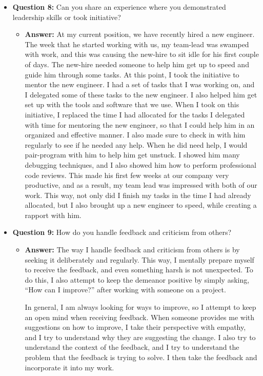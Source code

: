 \documentclass{article}
\begin{document}
\begin{itemize}
    \item \textbf{Question 8:} Can you share an experience where you demonstrated leadership skills or took initiative?
    \begin{itemize}
        \item \textbf{Answer:} At my current position, we have recently hired
        a new engineer. The week that he started working with us, my team-lead was swamped
        with work, and this was causing the new-hire to sit idle for his first
        couple of days. The new-hire needed someone to help him get up
        to speed and guide him through some tasks.
        At this point, I took the initiative to mentor the new engineer.
        I had a set of tasks that I was working on, and I delegated some
        of these tasks to the new engineer. I also helped him get set up
        with the tools and software that we use. When I took on this initiative,
        I replaced the time I had allocated for the tasks I delegated
        with time for mentoring the new engineer, so that I could
        help him in an organized and effective manner.
        I also made sure to check in with him
        regularly to see if he needed any help. When he did need help,
        I would pair-program with him to help him get unstuck. I showed him
        many debugging techniques, and I also showed him how to perform
        professional code reviews. This made his first few weeks at our
        company very productive, and as a result, my team lead was
        impressed with both of our work. This way, not only did I finish my tasks
        in the time I had already allocated, but I also brought up a new
        engineer to speed, while creating a rapport with him.
    \end{itemize}
    
    \item \textbf{Question 9:} How do you handle feedback and criticism from others?
    \begin{itemize}
        \item \textbf{Answer:} The way I handle feedback and criticism from others
        is by seeking it deliberately and regularly. This way, I mentally prepare
        myself to receive the feedback, and even something harsh is not
        unexpected. To do this, I also attempt to keep the
        demeanor positive by simply asking, ``How can I improve?'' after
        working with someone on a project.

        In general, I am always looking for ways to improve,
        so I attempt to keep an open mind when receiving feedback. When
        someone provides me with suggestions on how to improve, I take
        their perspective with empathy, and I try to understand why they
        are suggesting the change. I also try to understand the context
        of the feedback, and I try to understand the problem that the
        feedback is trying to solve. I then take the feedback and
        incorporate it into my work.
    \end{itemize}
    

\end{itemize}
\end{document}

